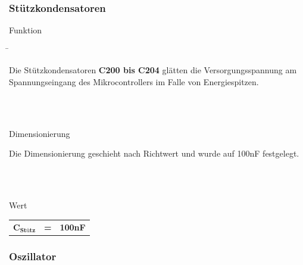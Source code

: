 \subsubsection{Stützkondensatoren}\label{subsubsec:Stützkondensatoren_Mikrocontroller}

\begin{tabbing}
\parbox[t]{.25\textwidth}{

Funktion

} \=\parbox[t]{.75\textwidth}{

Die Stützkondensatoren \textbf{C200 bis C204} glätten die Versorgungsspannung am Spannungseingang des Mikrocontrollers im Falle von Energiespitzen. 

}\\
\\
\parbox[t]{.25\textwidth}{

Dimensionierung

} \>\parbox[t]{.75\textwidth}{

Die Dimensionierung geschieht nach Richtwert und wurde auf 100nF festgelegt.

}\\
\\
\parbox[t]{.25\textwidth}{

Wert

} \>\parbox[t]{.75\textwidth}{

\begin{tabular}{lll}
$\mathbf{C_{Stütz}}$ & \textbf{=} &  \textbf{100nF} \\
\end{tabular}

}
\end{tabbing}

\subsubsection{Oszillator}\label{subsubsec:Oszillator_Mikrocontroller}

